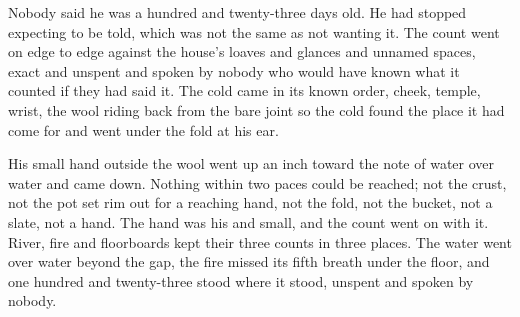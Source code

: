 Nobody said he was a hundred and twenty-three days old. He had stopped expecting to be told, which was not the same as not wanting it. The count went on edge to edge against the house's loaves and glances and unnamed spaces, exact and unspent and spoken by nobody who would have known what it counted if they had said it. The cold came in its known order, cheek, temple, wrist, the wool riding back from the bare joint so the cold found the place it had come for and went under the fold at his ear.

His small hand outside the wool went up an inch toward the note of water over water and came down. Nothing within two paces could be reached; not the crust, not the pot set rim out for a reaching hand, not the fold, not the bucket, not a slate, not a hand. The hand was his and small, and the count went on with it. River, fire and floorboards kept their three counts in three places. The water went over water beyond the gap, the fire missed its fifth breath under the floor, and one hundred and twenty-three stood where it stood, unspent and spoken by nobody.
